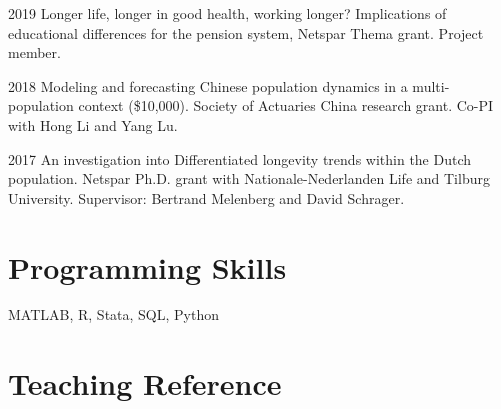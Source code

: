 \documentclass[12pt,letterpaper]{report}
\newcommand{\listitemspace}{0.15em}
\renewenvironment{itemize}
{\begin{list}{}{\setlength{\leftmargin}{0em}
            \setlength{\parskip}{0em}
            \setlength{\itemsep}{\listitemspace}
            \setlength{\parsep}{\listitemspace}}}
    {\end{list}}
\begin{document}
    \begin{tablist}

   
        \item[2019] \tab Longer life, longer in good health, working longer? Implications of educational differences for the pension system, Netspar Thema grant. Project member. 
        
        \item[2018] \tab  Modeling and forecasting Chinese population dynamics in a multi-population context (\$10,000). Society of Actuaries China research grant. Co-PI with Hong Li and Yang Lu.
        
        \item[2017] \tab An investigation into Differentiated longevity trends within the Dutch population. Netspar Ph.D. grant with Nationale-Nederlanden Life and Tilburg University. Supervisor: Bertrand Melenberg and David Schrager.


    \end{tablist}




    	\section*{Programming Skills}
    	
    	
    	\begin{itemize}
    		
    		\item MATLAB, R, Stata, SQL, Python
    		
    	\end{itemize}
    	

\section*{Teaching Reference}
\end{document}
